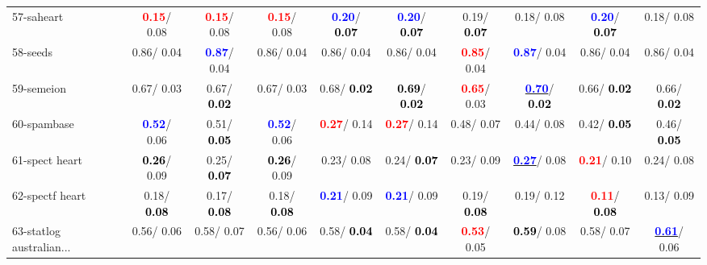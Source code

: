 \begin{table}[h]
\begin{center}
{\begin{tabular}{lc|c|c|c|c|c|c|c|c}
57-saheart & \textcolor{red}{\textbf{  0.15}}/  0.08 & \textcolor{red}{\textbf{  0.15}}/  0.08 & \textcolor{red}{\textbf{  0.15}}/  0.08 & \textcolor{blue}{\textbf{  0.20}}/\textcolor{black}{\textbf{  0.07}} & \textcolor{blue}{\textbf{  0.20}}/\textcolor{black}{\textbf{  0.07}} &   0.19/\textcolor{black}{\textbf{  0.07}} &   0.18/  0.08 & \textcolor{blue}{\textbf{  0.20}}/\textcolor{black}{\textbf{  0.07}} &   0.18/  0.08 \\
58-seeds &   0.86/  0.04 & \textcolor{blue}{\textbf{  0.87}}/  0.04 &   0.86/  0.04 &   0.86/  0.04 &   0.86/  0.04 & \textcolor{red}{\textbf{  0.85}}/  0.04 & \textcolor{blue}{\textbf{  0.87}}/  0.04 &   0.86/  0.04 &   0.86/  0.04 \\
59-semeion &   0.67/  0.03 &   0.67/\textcolor{black}{\textbf{  0.02}} &   0.67/  0.03 &   0.68/\textcolor{black}{\textbf{  0.02}} & \textcolor{black}{\textbf{  0.69}}/\textcolor{black}{\textbf{  0.02}} & \textcolor{red}{\textbf{  0.65}}/  0.03 & \underline{\textcolor{blue}{\textbf{  0.70}}}/\textcolor{black}{\textbf{  0.02}} &   0.66/\textcolor{black}{\textbf{  0.02}} &   0.66/\textcolor{black}{\textbf{  0.02}} \\
60-spambase & \textcolor{blue}{\textbf{  0.52}}/  0.06 &   0.51/\textcolor{black}{\textbf{  0.05}} & \textcolor{blue}{\textbf{  0.52}}/  0.06 & \textcolor{red}{\textbf{  0.27}}/  0.14 & \textcolor{red}{\textbf{  0.27}}/  0.14 &   0.48/  0.07 &   0.44/  0.08 &   0.42/\textcolor{black}{\textbf{  0.05}} &   0.46/\textcolor{black}{\textbf{  0.05}} \\ \hline
61-spect heart & \textcolor{black}{\textbf{  0.26}}/  0.09 &   0.25/\textcolor{black}{\textbf{  0.07}} & \textcolor{black}{\textbf{  0.26}}/  0.09 &   0.23/  0.08 &   0.24/\textcolor{black}{\textbf{  0.07}} &   0.23/  0.09 & \underline{\textcolor{blue}{\textbf{  0.27}}}/  0.08 & \textcolor{red}{\textbf{  0.21}}/  0.10 &   0.24/  0.08 \\
62-spectf heart &   0.18/\textcolor{black}{\textbf{  0.08}} &   0.17/\textcolor{black}{\textbf{  0.08}} &   0.18/\textcolor{black}{\textbf{  0.08}} & \textcolor{blue}{\textbf{  0.21}}/  0.09 & \textcolor{blue}{\textbf{  0.21}}/  0.09 &   0.19/\textcolor{black}{\textbf{  0.08}} &   0.19/  0.12 & \textcolor{red}{\textbf{  0.11}}/\textcolor{black}{\textbf{  0.08}} &   0.13/  0.09 \\
63-statlog australian... &   0.56/  0.06 &   0.58/  0.07 &   0.56/  0.06 &   0.58/\textcolor{black}{\textbf{  0.04}} &   0.58/\textcolor{black}{\textbf{  0.04}} & \textcolor{red}{\textbf{  0.53}}/  0.05 & \textcolor{black}{\textbf{  0.59}}/  0.08 &   0.58/  0.07 & \underline{\textcolor{blue}{\textbf{  0.61}}}/  0.06 \\

\end{tabular}}
\end{center}
\end{table}
